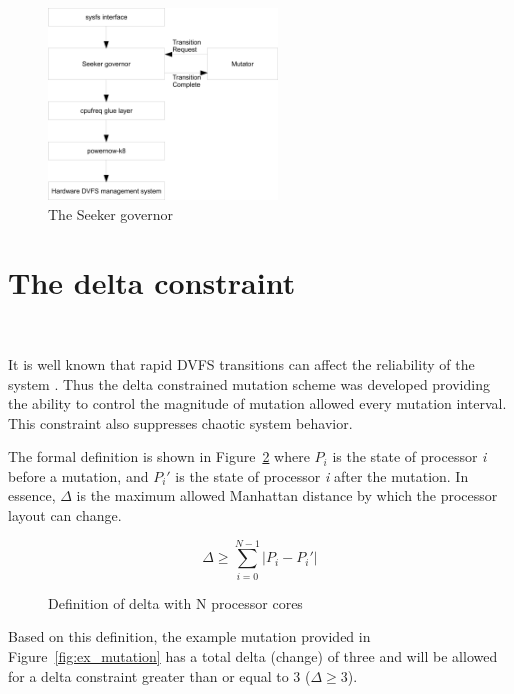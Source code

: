 \begin{figure}[h!]
  \begin{center}
    \includegraphics[height=2in]{figures/seeker_governor.jpg}%
    \caption{The Seeker governor}
    \label{fig:governor}
  \end{center}
\end{figure}

\section{The delta constraint}~\label{sec:delta_constraint}


It is well known that rapid DVFS transitions can affect the reliability of the system \cite{ImpactDVFS}.
Thus the delta constrained mutation scheme was developed providing the ability
to control the magnitude of mutation allowed every mutation interval. This 
constraint also suppresses chaotic system behavior. 

The formal definition is shown in Figure~\ref{fig:Delta_def} where $P_{i}$ is the state of processor \textit{i} 
before a mutation, and $P_{i}'$ is the state of processor \textit{i} after the mutation.
In essence, $\Delta$ is the maximum allowed Manhattan distance by which the processor layout can change. 

\begin{figure}[h!]
\centering
\begin{equation*}
    \Delta \geq \displaystyle\sum_{i=0}^{N-1} {| P_{i} - P_{i}' |}
\end{equation*}
\caption{Definition of delta with N processor cores}
\label{fig:Delta_def}
\end{figure}

Based on this definition, the example mutation provided in Figure~\ref{fig:ex_mutation} has 
a total delta (change) of three and will be allowed for a delta constraint greater than
or equal to 3 ($\Delta \geq 3$).

